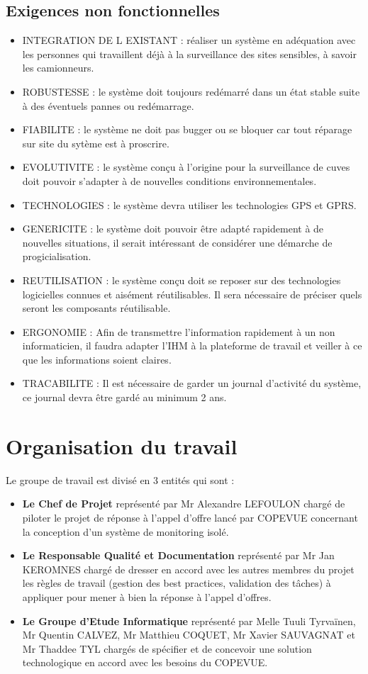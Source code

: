     \subsection{Exigences non fonctionnelles}
\begin{itemize}
\item INTEGRATION DE L EXISTANT : réaliser un système en adéquation avec les personnes qui travaillent déjà à la surveillance des sites sensibles, à savoir les camionneurs.
\item ROBUSTESSE : le système doit toujours redémarré dans un état stable suite à des éventuels pannes ou redémarrage.
\item FIABILITE : le système ne doit pas bugger ou se bloquer car tout réparage sur site du sytème est à proscrire.
\item EVOLUTIVITE : le système conçu à l'origine pour la surveillance de cuves doit pouvoir s'adapter à de nouvelles conditions environnementales.
\item TECHNOLOGIES : le système devra utiliser les technologies GPS et GPRS.
\item GENERICITE : le système doit pouvoir être adapté rapidement à de nouvelles situations, il serait intéressant de considérer une démarche de progicialisation.
\item REUTILISATION : le système conçu doit se reposer sur des technologies logicielles connues et aisément réutilisables. Il sera nécessaire de préciser quels seront les composants réutilisable.
\item ERGONOMIE : Afin de transmettre l'information rapidement à un non informaticien, il faudra adapter l'IHM à la plateforme de travail et veiller à ce que les informations soient claires.
\item TRACABILITE : Il est nécessaire de garder un journal d'activité du système, ce journal devra être gardé au minimum 2 ans.
\end{itemize}
   
\section{Organisation du travail}
Le groupe de travail est divisé en 3 entités qui sont :
\begin{itemize}
\item \textbf{Le Chef de Projet} représenté par Mr Alexandre LEFOULON chargé de piloter le projet de réponse à l'appel d'offre lancé par COPEVUE concernant la conception d'un système de monitoring isolé.
\item \textbf{Le Responsable Qualité et Documentation} représenté par Mr Jan KEROMNES chargé de dresser en accord avec les autres membres du projet les règles de travail (gestion des best practices, validation des tâches) à appliquer pour mener à bien la réponse à l'appel d'offres.
\item \textbf{Le Groupe d'Etude Informatique} représenté par Melle Tuuli Tyrvaïnen, Mr Quentin CALVEZ, Mr Matthieu COQUET, Mr Xavier SAUVAGNAT et Mr Thaddee TYL chargés de spécifier et de concevoir une solution technologique en accord avec les besoins du COPEVUE.
\end{itemize}


